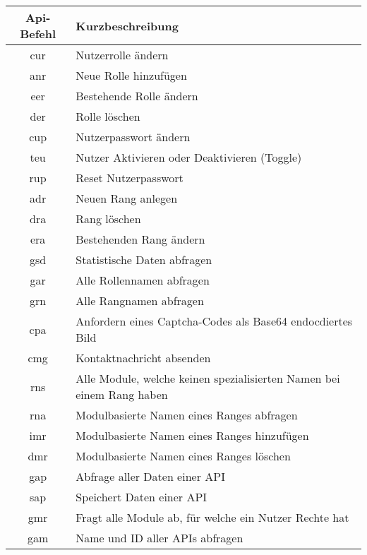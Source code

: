 \begin{longtable}[H]{|c|p{12cm}|}
		\hline
		\textbf{Api-Befehl} & \textbf{Kurzbeschreibung}              \\ \hline
		cur                 & Nutzerrolle ändern          \\ \hline
		anr                 & Neue Rolle hinzufügen            \\ \hline
		eer                 & Bestehende Rolle ändern \\ \hline
		der                 & Rolle löschen \\ \hline
		cup                 & Nutzerpasswort ändern \\ \hline
		teu                 & Nutzer Aktivieren oder Deaktivieren (Toggle) \\ \hline
		rup                 & Reset Nutzerpasswort \\ \hline
		adr                 & Neuen Rang anlegen \\ \hline
		dra                 & Rang löschen \\ \hline
		era                 & Bestehenden Rang ändern \\ \hline
		gsd                 & Statistische Daten abfragen \\ \hline
		gar                 & Alle Rollennamen abfragen \\ \hline
		grn                 & Alle Rangnamen abfragen \\ \hline
		cpa                 & Anfordern eines Captcha-Codes als Base64 endocdiertes Bild \\ \hline
        cmg                 & Kontaktnachricht absenden \\ \hline
        rns                 & Alle Module, welche keinen spezialisierten Namen bei einem Rang haben \\ \hline
        rna                 & Modulbasierte Namen eines Ranges abfragen \\ \hline
        imr                 & Modulbasierte Namen eines Ranges hinzufügen\\ \hline
        dmr                 & Modulbasierte Namen eines Ranges löschen\\ \hline
        gap                 & Abfrage aller Daten einer API\\ \hline
        sap                 & Speichert Daten einer API\\ \hline
        gmr                 & Fragt alle Module ab, für welche ein Nutzer Rechte hat\\ \hline
        gam                 & Name und ID aller APIs abfragen\\ \hline

\end{longtable}
